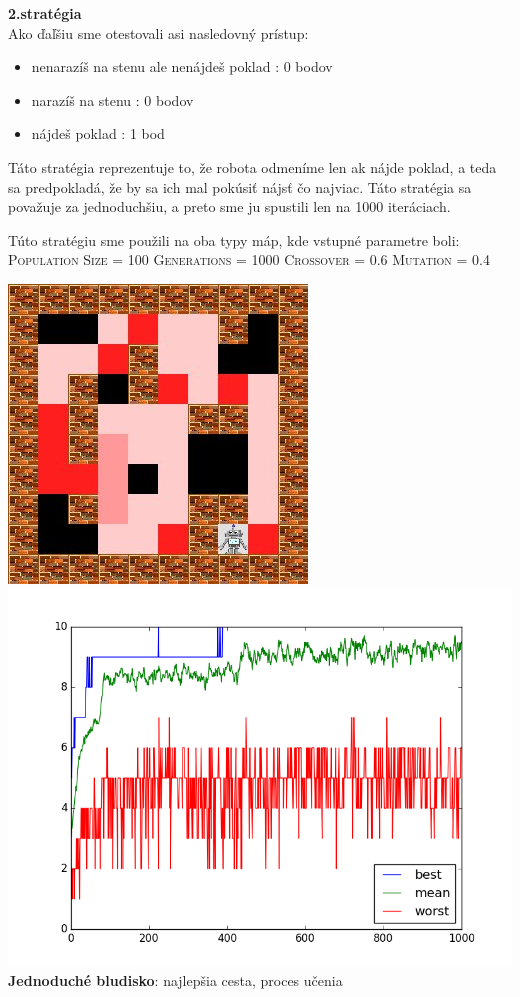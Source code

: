 \documentclass[10pt]{paper}
\begin{document}
\textbf{2.stratégia}\\
Ako ďaľšiu sme otestovali asi nasledovný prístup:
\begin{itemize}
\item nenarazíš na stenu ale nenájdeš poklad : 0 bodov
\item narazíš na stenu : 0 bodov
\item nájdeš poklad : 1 bod
\end{itemize}
Táto stratégia reprezentuje to, že robota odmeníme len ak nájde poklad, a teda sa predpokladá, že by sa ich mal pokúsiť nájsť čo najviac. Táto stratégia sa považuje za jednoduchšiu, a preto sme ju spustili len na 1000 iteráciach.

\noindent Túto stratégiu sme použili na oba typy máp, kde vstupné parametre boli:\\

\textsc{Population Size} = 100 \textsc{Generations} = 1000  \textsc{Crossover} = 0.6  \textsc{Mutation} = 0.4

\begin{center}
  \includegraphics[scale=0.5]{strategy2_simple.jpg} 
  \includegraphics[scale=0.38]{strategy2_simple_graph.png} \\
   \textbf{Jednoduché bludisko}: najlepšia cesta, proces učenia
     \end{center}
     
\end{document}
